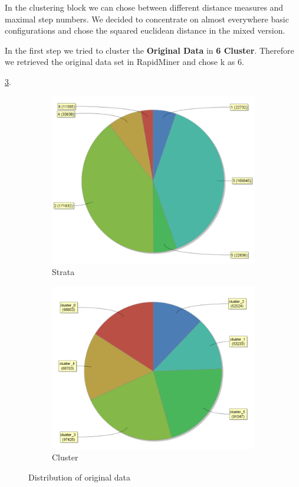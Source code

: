 In the clustering block we can chose between different distance measures and maximal step numbers. We decided to concentrate on almost everywhere basic configurations and chose the squared euclidean distance in the mixed version.

In the first step we tried to cluster the \textbf{Original Data} in \textbf{6 Cluster}. Therefore we retrieved the original data set in RapidMiner and chose k as 6.

\ref{fig:OrgDist}. 
\begin{figure}[H]
\centering
\begin{subfigure}{.5\textwidth}
  \centering
  \includegraphics[width=.8\linewidth]{ClusterOrigRapidStrata.PNG}
  \caption{Strata}
  \label{fig:OrgSt}
\end{subfigure}%
\begin{subfigure}{.5\textwidth}
  \centering
  \includegraphics[width=.8\linewidth]{ClusterOrigRapidCluster.PNG}
  \caption{Cluster}
  \label{fig:OrgCl}
\end{subfigure}
\caption{Distribution of original data}
\label{fig:OrgDist}
\end{figure}

